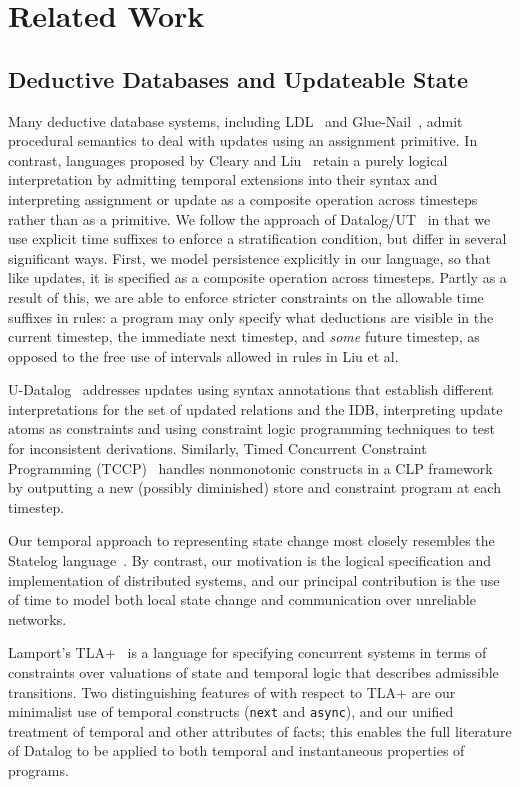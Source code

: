 \section{Related Work}


\subsection{Deductive Databases and Updateable State}

Many deductive database systems, including LDL~\cite{ldl} and Glue-Nail~\cite{glue-nail}, admit procedural semantics to deal with updates using an
assignment primitive.  In contrast, languages proposed by Cleary and Liu~\cite{harmful,deductiveupdates,starlog} retain a purely logical 
interpretation by admitting temporal extensions into their syntax and interpreting assignment or update as a composite operation
across timesteps~\cite{deductiveupdates} rather than as a primitive.  We follow the approach of Datalog/UT~\cite{deductiveupdates} in that we use explicit time suffixes to enforce a stratification condition,
but differ in several significant ways.
First, we model persistence explicitly in our language, so that like updates, it is specified as a composite operation across timesteps.
Partly as a result of this, we are able to enforce stricter constraints on the allowable time suffixes in rules: a program may only specify what deductions are visible
in the current timestep, the immediate next timestep, and \emph{some} future timestep, as opposed to the free use of intervals allowed in rules in Liu et al.  


U-Datalog~\cite{udatalog-neg} addresses updates using syntax annotations that establish different interpretations for the set of updated 
relations and the IDB, interpreting update atoms as constraints and using constraint logic programming techniques to test for inconsistent
derivations.  Similarly, Timed Concurrent Constraint Programming (TCCP)~\cite{tdccp,tccp} handles nonmonotonic constructs in a CLP framework
by outputting a new (possibly diminished) store and constraint program at each timestep.  

Our temporal approach to representing state change most closely resembles the
Statelog language~\cite{statelog}.  
By contrast, our motivation is
the logical specification and implementation of distributed systems, and our 
principal contribution is the use of time to model both local state change and communication
over unreliable networks.

Lamport's TLA+~\cite{tla} is a language for specifying concurrent systems in
terms of constraints over valuations of state and temporal logic that describes
admissible transitions.  Two distinguishing features of \lang with respect to
TLA+ are our minimalist use of temporal constructs (\texttt{next} and
\texttt{async}), and our unified treatment of temporal and other attributes of
facts; this enables the full literature of Datalog to be applied to both
temporal and instantaneous properties of programs.

